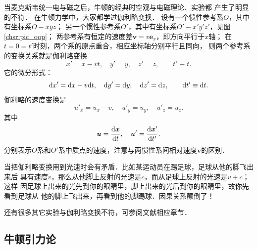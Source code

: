 当麦克斯韦统一电与磁之后，牛顿的经典时空观与电磁理论、实验都
产生了明显的不符．
在牛顿力学中，大家都学过伽利略变换．
设有一个惯性参考系$O$，其中有坐标系$O-xyz$；
另一个惯性参考系$O'$，其中有坐标系$O'-x'y'z'$，见图\ref{chsr:pic_oop}；
两参考系有恒定的速度差$\boldsymbol{v}=v \boldsymbol{e}_x$，即方向平行于$x$轴；
在$t=0=t'$时刻，两个系的原点重合，相应坐标轴分别平行且同向，
则两个参考系的变换关系就是伽利略变换
\begin{equation}\label{chsr:eqn_galileo-trans-x}
    x' = x -vt, \quad
    y' = y, \quad
    z' = z, \qquad
    t' \equiv t.
\end{equation}
它的微分形式：
\begin{equation}\label{chsr:eqn_galileo-trans-dx}
	{\rm d}x' = {\rm d}x -v {\rm d}t, \quad
	{\rm d}y' = {\rm d}y, \quad
	{\rm d}z' = {\rm d}z, \qquad
	{\rm d}t' \equiv {\rm d}t.
\end{equation}
伽利略的速度变换是
\begin{equation}\label{chsr:eqn_galileo-trans-vel}
    u'_x = u_x -v, \quad
    u'_y = u_y, \quad
    u'_z = u_z.
\end{equation}
其中
\begin{equation}\label{chsr:eqn_3-Velocity}
  \boldsymbol{u}=\frac{{\rm d} \boldsymbol{x}}{{\rm d}t}, \quad   \boldsymbol{u}'=\frac{{\rm d} \boldsymbol{x}'}{{\rm d}t'} .
\end{equation}
分别表示$O$系和$O'$系中质点的速度，注意与两惯性系间相对速度$\boldsymbol{v}$的区别．




当把伽利略变换用到光速时会有矛盾．比如某运动员在踢足球，足球从他的脚飞出来后
具有速度$v$，那么从他脚上反射的光速是$c$，而从足球上反射的光速是$v+c$；这样
因足球上出来的光先到你的眼睛里，脚上出来的光后到你的眼睛里，故你先看到足球从
他的脚上飞出来，再看到他的脚踢球．因果关系颠倒了！

还有很多其它实验与伽利略变换不符，可参阅文献\parencite{jackson1998,liu_fei2008,zhangyz-2023}相应章节．




\subsection{牛顿引力论}\label{chsr:sec_Newton-Gravity}

